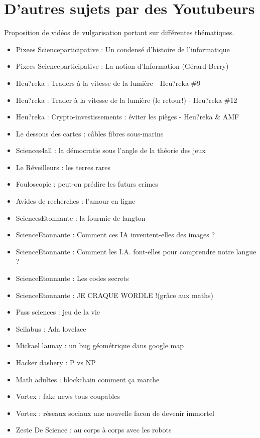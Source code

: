 \section{D'autres sujets par des Youtubeurs}
Proposition de vidéos de vulgarisation portant sur différentes thématiques.
\begin{itemize}
    \item Pixees Scienceparticipative : Un condensé d'histoire de l'informatique
    \item Pixees Scienceparticipative : La notion d'Information (Gérard Berry)
    \item Heu?reka : Traders à la vitesse de la lumière - Heu?reka \#9
    \item Heu?reka : Trader à la vitesse de la lumière (le retour!) - Heu?reka \#12
    \item Heu?reka : Crypto-investissements : éviter les pièges - Heu?reka \& AMF
    \item Le dessous des cartes : câbles fibres sous-marins
    \item Sciences4all : la démocratie sous l’angle de la théorie des jeux 
    \item Le Réveilleurs : les terres rares 
    \item Fouloscopie : peut-on prédire les futurs crimes 
    \item Avides de recherches : l’amour en ligne 
    \item SciencesEtonnante : la fourmie de langton
    \item ScienceEtonnante : Comment ces IA inventent-elles des images ?
    \item ScienceEtonnante : Comment les I.A. font-elles pour comprendre notre langue ?
    \item ScienceEtonnante : Les codes secrets
    \item ScienceEtonnante : JE CRAQUE WORDLE !(grâce aux maths)
    \item Pass sciences : jeu de la vie
    \item Scilabus : Ada lovelace
    \item Mickael launay : un bug géométrique dans google map
    \item Hacker dashery : P vs NP
    \item Math adultes : blockchain comment ça marche
    \item Vortex : fake news tous coupables 
    \item Vortex : réseaux sociaux une nouvelle facon de devenir immortel 
    \item Zeste De Science : au corps à corps avec les robots

\end{itemize}
